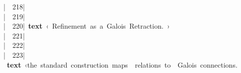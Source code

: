 \documentclass{article}
\newcommand{\syntaxCOMMENTC}[1]{\textcolor[rgb]{0.4,0.0,0.8}{#1}}
\newcommand{\syntaxKEYWORDA}[1]{\textcolor[rgb]{0.0,0.4,0.6}{\textbf{#1}}}
\newcommand{\syntaxCOMMENTC}[1]{\textcolor[rgb]{0.4,0.0,0.8}{#1}}
\newcommand{\syntaxKEYWORDA}[1]{\textcolor[rgb]{0.0,0.4,0.6}{\textbf{#1}}}
\newcommand{\syntaxCOMMENTC}[1]{\textcolor[rgb]{0.4,0.0,0.8}{#1}}
\newcommand{\syntaxKEYWORDA}[1]{\textcolor[rgb]{0.0,0.4,0.6}{\textbf{#1}}}
\newcommand{\syntaxCOMMENTC}[1]{\textcolor[rgb]{0.4,0.0,0.8}{\textbf{#1}}}
\newcommand{\syntaxKEYWORDA}[1]{\textcolor[rgb]{0.0,0.4,0.6}{#1}}
\newcommand{\syntaxCOMMENTC}[1]{\textcolor[rgb]{0.4,0.0,0.8}{#1}}
\newcommand{\syntaxKEYWORDA}[1]{\textcolor[rgb]{0.0,0.4,0.6}{\textbf{#1}}}
\newcommand{\syntaxCOMMENTC}[1]{\textcolor[rgb]{0.4,0.0,0.8}{#1}}
\newcommand{\syntaxKEYWORDA}[1]{\textcolor[rgb]{0.0,0.4,0.6}{\textbf{#1}}}
\newcommand{\syntaxCOMMENTC}[1]{\textcolor[rgb]{0.0,0.0,0.0}{#1}}
\newcommand{\syntaxKEYWORDA}[1]{\textcolor[rgb]{0.0,0.0,0.0}{#1}}
\newcommand{\gutter}[1]{\textcolor[rgb]{0,0,0}{{|}#1}}
\newcommand{\gutterH}[1]{\textcolor[rgb]{1,0,0}{{|}#1}}
\begin{document}
\gutter{\ \ 218{|}\ }\hspace*{\fill}\\
\gutter{\ \ 219{|}\ }\hspace*{\fill}\\
\gutterH{\ \ 220{|}\ }\syntaxKEYWORDA{text}{\ }\syntaxCOMMENTC{‹}\syntaxCOMMENTC{{\ }}\syntaxCOMMENTC{R}\syntaxCOMMENTC{e}\syntaxCOMMENTC{f}\syntaxCOMMENTC{i}\syntaxCOMMENTC{n}\syntaxCOMMENTC{e}\syntaxCOMMENTC{m}\syntaxCOMMENTC{e}\syntaxCOMMENTC{n}\syntaxCOMMENTC{t}\syntaxCOMMENTC{{\ }}\syntaxCOMMENTC{a}\syntaxCOMMENTC{s}\syntaxCOMMENTC{{\ }}\syntaxCOMMENTC{a}\syntaxCOMMENTC{{\ }}\syntaxCOMMENTC{G}\syntaxCOMMENTC{a}\syntaxCOMMENTC{l}\syntaxCOMMENTC{o}\syntaxCOMMENTC{i}\syntaxCOMMENTC{s}\syntaxCOMMENTC{{\ }}\syntaxCOMMENTC{R}\syntaxCOMMENTC{e}\syntaxCOMMENTC{t}\syntaxCOMMENTC{r}\syntaxCOMMENTC{a}\syntaxCOMMENTC{c}\syntaxCOMMENTC{t}\syntaxCOMMENTC{i}\syntaxCOMMENTC{o}\syntaxCOMMENTC{n}\syntaxCOMMENTC{.}\syntaxCOMMENTC{{\ }}\syntaxCOMMENTC{›}\hspace*{\fill}\\
\gutter{\ \ 221{|}\ }\hspace*{\fill}\\
\gutter{\ \ 222{|}\ }\hspace*{\fill}\\
\gutter{\ \ 223{|}\ }\syntaxKEYWORDA{text}{\ }\syntaxCOMMENTC{‹}\syntaxCOMMENTC{t}\syntaxCOMMENTC{h}\syntaxCOMMENTC{e}\syntaxCOMMENTC{{\ }}\syntaxCOMMENTC{s}\syntaxCOMMENTC{t}\syntaxCOMMENTC{a}\syntaxCOMMENTC{n}\syntaxCOMMENTC{d}\syntaxCOMMENTC{a}\syntaxCOMMENTC{r}\syntaxCOMMENTC{d}\syntaxCOMMENTC{{\ }}\syntaxCOMMENTC{c}\syntaxCOMMENTC{o}\syntaxCOMMENTC{n}\syntaxCOMMENTC{s}\syntaxCOMMENTC{t}\syntaxCOMMENTC{r}\syntaxCOMMENTC{u}\syntaxCOMMENTC{c}\syntaxCOMMENTC{t}\syntaxCOMMENTC{i}\syntaxCOMMENTC{o}\syntaxCOMMENTC{n}\syntaxCOMMENTC{{\ }}\syntaxCOMMENTC{m}\syntaxCOMMENTC{a}\syntaxCOMMENTC{p}\syntaxCOMMENTC{s}\syntaxCOMMENTC{{\ }}\syntaxCOMMENTC{{\ }}\syntaxCOMMENTC{r}\syntaxCOMMENTC{e}\syntaxCOMMENTC{l}\syntaxCOMMENTC{a}\syntaxCOMMENTC{t}\syntaxCOMMENTC{i}\syntaxCOMMENTC{o}\syntaxCOMMENTC{n}\syntaxCOMMENTC{s}\syntaxCOMMENTC{{\ }}\syntaxCOMMENTC{t}\syntaxCOMMENTC{o}\syntaxCOMMENTC{{\ }}\syntaxCOMMENTC{{\ }}\syntaxCOMMENTC{G}\syntaxCOMMENTC{a}\syntaxCOMMENTC{l}\syntaxCOMMENTC{o}\syntaxCOMMENTC{i}\syntaxCOMMENTC{s}\syntaxCOMMENTC{{\ }}\syntaxCOMMENTC{c}\syntaxCOMMENTC{o}\syntaxCOMMENTC{n}\syntaxCOMMENTC{n}\syntaxCOMMENTC{e}\syntaxCOMMENTC{c}\syntaxCOMMENTC{t}\syntaxCOMMENTC{i}\syntaxCOMMENTC{o}\syntaxCOMMENTC{n}\syntaxCOMMENTC{s}\syntaxCOMMENTC{.}\hspace*{\fill}\\
\end{document}
